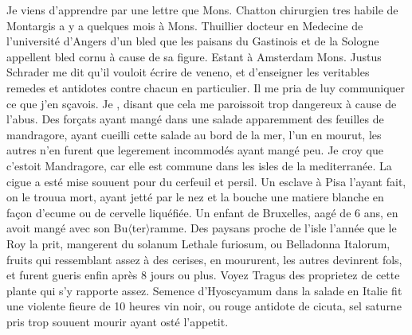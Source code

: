 \count{}
\count{}
\count{}
\pstart
Je viens d'apprendre par une lettre que Mons. Chatton chirurgien tres habile de Montargis\protect{} a  y a quelques mois \`{a} Mons. Thuillier docteur en Medecine de l'universit\'{e} d'Angers\protect{} d'un bled
que les paisans du Gastinois\protect{} et de la Sologne\protect{} appellent bled
cornu \`{a} cause de sa figure. Estant \`{a} Amsterdam\protect{} Mons. Justus Schrader\protect{} me dit qu'il vouloit \'{e}crire de veneno\protect{}, et d'enseigner les veritables remedes et antidotes\protect{} contre chacun en particulier. Il me pria de luy communiquer ce que j'en s\c{c}avois. Je , disant que cela me paroissoit trop dangereux \`{a} cause de l'abus. Des for\c{c}ats\protect{} ayant mang\'{e} dans une salade apparemment des feuilles de mandragore\protect{}, ayant cueilli cette salade au bord de la mer, l'un en mourut, les autres n'en furent que legerement incommod\'{e}s ayant mang\'{e} peu. Je croy que c'estoit Mandragore\protect{}, car elle est commune dans les isles de la mediterran\'{e}e\protect{}. La cigue a est\'{e} mise souuent pour du cerfeuil\protect{} et persil\protect{}. Un esclave \`{a} Pisa\protect{} l'ayant fait, on le trouua mort, ayant jett\'{e} par le nez et la bouche une matiere blanche en fa\c{c}on d'ecume ou de cervelle liqu\'{e}fi\'{e}e. Un enfant de Bruxelles\protect{}, aag\'{e} de 6 ans, en avoit mang\'{e} avec son
%
Bu$\langle$ter$\rangle$ramme.
%
Des paysans proche de l'isle l'ann\'{e}e que le Roy la prit, mangerent du solanum Lethale furiosum\protect{}, ou Belladonna Italorum\protect{}, fruits qui ressemblant assez \`{a} des cerises,  en moururent, les autres devinrent fols, et furent gueris enfin après 8 jours ou plus. Voyez Tragus\protect{} des proprietez de cette plante qui s'y rapporte assez. Semence d'Hyoscyamum\protect{} dans la salade en Italie\protect{} fit une violente fieure de 10 heures vin noir, ou rouge antidote de cicuta\protect{}, sel saturne\protect{} pris trop souuent  mourir ayant ost\'{e} l'appetit.
